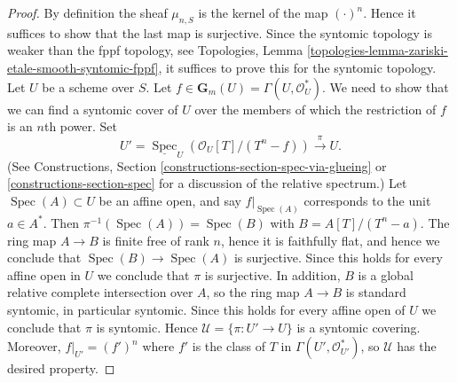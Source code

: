\documentclass[10pt,a4paper]{amsart}
\theoremstyle{plain}
\theoremstyle{definition}
\theoremstyle{remark}
\numberwithin{equation}{subsection}
\def\Spec{\mathop{\mathrm{Spec}}}
\begin{document}
\begin{proof}
By definition the sheaf $\mu_{n, S}$ is the kernel of the map
$(\cdot)^n$. Hence it suffices to show that the last map is surjective.
Since the syntomic topology is weaker than the fppf topology, see
Topologies, Lemma \ref{topologies-lemma-zariski-etale-smooth-syntomic-fppf},
it suffices to prove this for the syntomic topology.
Let $U$ be a scheme over $S$. Let
$f \in \mathbf{G}_m(U) = \Gamma(U, \mathcal{O}_U^*)$.
We need to show that we can find a syntomic cover of
$U$ over the members of which the restriction of $f$ is an $n$th power.
Set
$$
U' =
\underline{\Spec}_U(\mathcal{O}_U[T]/(T^n-f))
\xrightarrow{\pi}
U.
$$
(See
Constructions, Section \ref{constructions-section-spec-via-glueing} or
\ref{constructions-section-spec}
for a discussion of the relative spectrum.)
Let $\Spec(A) \subset U$ be an affine open, and say $f|_{\Spec(A)}$ corresponds
to the unit $a \in A^*$. Then $\pi^{-1}(\Spec(A)) = \Spec(B)$ with
$B = A[T]/(T^n - a)$. The ring map $A \to B$ is finite free of rank $n$,
hence it is faithfully flat, and hence we conclude that
$\Spec(B) \to \Spec(A)$ is surjective. Since this holds for every
affine open in $U$ we conclude that $\pi$ is surjective.
In addition, $B$ is a global relative complete intersection over $A$, so
the ring map $A \to B$ is standard syntomic,
in particular syntomic. Since this holds for every affine open of $U$
we conclude that $\pi$ is syntomic. Hence
$\mathcal{U} = \{\pi : U' \to U\}$ is a syntomic covering.
Moreover, $f|_{U'} = (f')^n$ where $f'$ is the class of $T$
in $\Gamma(U', \mathcal{O}_{U'}^*)$, so $\mathcal{U}$ has the desired property.
\end{proof}
\end{document}
